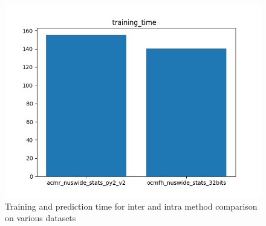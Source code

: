 \begin{figure}[H]
\begin{minipage}[!h]{0.6\linewidth}
                \vspace{0.1ex}
                \hspace{1ex}
            \end{minipage}
            \begin{minipage}[!h]{0.8\linewidth}
                \centering
                \includegraphics[width=\linewidth]{resultsImages/time/training_time _both_nuswide.jpeg}
                \vspace{0.1ex}
                \hspace{0.1ex}
            \end{minipage}
            \caption{Training and prediction time for inter and intra method comparison on various datasets}
        \label{fig:}
        \end{figure}
        \FloatBarrier